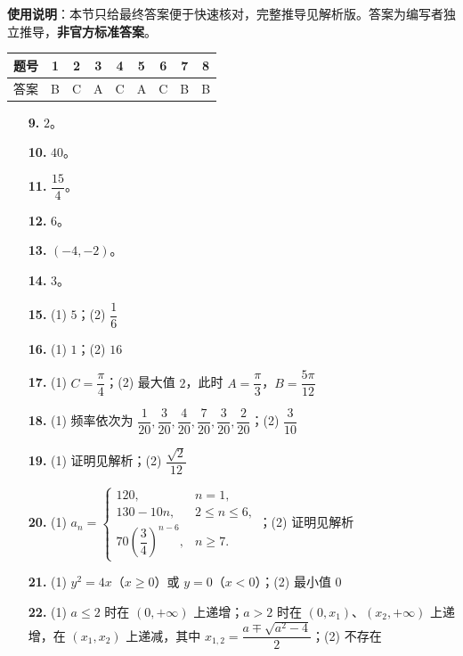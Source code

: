 
\begin{gknotice}
\textbf{使用说明}：本节只给最终答案便于快速核对，完整推导见解析版。答案为编写者独立推导，\textbf{非官方标准答案}。
\end{gknotice}

\begin{center}\begin{tabular}{ccccccccc}
\toprule
题号 & 1 & 2 & 3 & 4 & 5 & 6 & 7 & 8 \\
\midrule
答案 & B & C & A & C & A & C & B & B \\
\bottomrule
\end{tabular}\end{center}

\begin{itemize}[leftmargin=2.6em]
  \item[\textbf{9.}] $2$。
  \item[\textbf{10.}] $40$。
  \item[\textbf{11.}] $\dfrac{15}4$。
  \item[\textbf{12.}] $6$。
  \item[\textbf{13.}] $(-4,-2)$。
  \item[\textbf{14.}] $3$。
  \item[\textbf{15.}] (1) $5$；(2) $\dfrac16$
  \item[\textbf{16.}] (1) $1$；(2) $16$
\end{itemize}

\begin{itemize}[leftmargin=2.6em]
  \item[\textbf{17.}] (1) $C=\dfrac\pi4$；(2) 最大值 $2$，此时 $A=\dfrac\pi3$，$B=\dfrac{5\pi}{12}$
  \item[\textbf{18.}] (1) 频率依次为 $\dfrac1{20},\dfrac3{20},\dfrac4{20},\dfrac7{20},\dfrac3{20},\dfrac2{20}$；(2) $\dfrac3{10}$
  \item[\textbf{19.}] (1) 证明见解析；(2) $\dfrac{\sqrt2}{12}$
  \item[\textbf{20.}] (1) $a_n=\begin{cases}120,&n=1,\\130-10n,&2\leqslant n\leqslant6,\\70\left(\dfrac34\right)^{n-6},&n\geqslant7.\end{cases}$；(2) 证明见解析
  \item[\textbf{21.}] (1) $y^2=4x$（$x\geqslant0$）或 $y=0$（$x<0$）；(2) 最小值 $0$
  \item[\textbf{22.}] (1) $a\leqslant2$ 时在 $(0,+\infty)$ 上递增；$a>2$ 时在 $(0,x_1)$、$(x_2,+\infty)$ 上递增，在 $(x_1,x_2)$ 上递减，其中 $x_{1,2}=\dfrac{a\mp\sqrt{a^2-4}}2$；(2) 不存在
\end{itemize}
